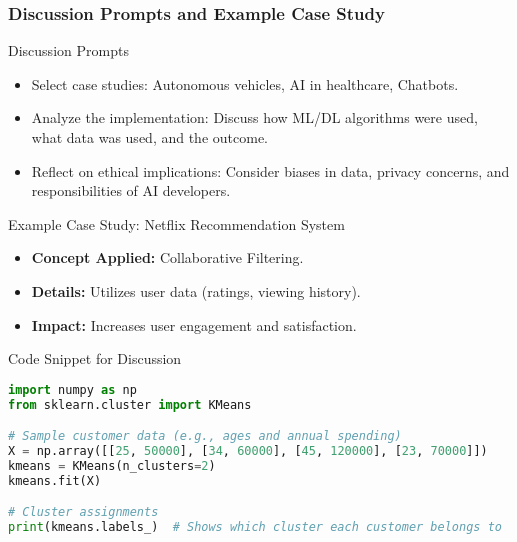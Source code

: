 \documentclass[aspectratio=169]{beamer}
\begin{document}
\begin{frame}[fragile]
    \frametitle{Discussion Prompts and Example Case Study}
    
    \begin{block}{Discussion Prompts}
        \begin{itemize}
            \item Select case studies: Autonomous vehicles, AI in healthcare, Chatbots.
            \item Analyze the implementation: Discuss how ML/DL algorithms were used, what data was used, and the outcome.
            \item Reflect on ethical implications: Consider biases in data, privacy concerns, and responsibilities of AI developers.
        \end{itemize}
    \end{block}

    \begin{block}{Example Case Study: Netflix Recommendation System}
        \begin{itemize}
            \item \textbf{Concept Applied:} Collaborative Filtering.
            \item \textbf{Details:} Utilizes user data (ratings, viewing history).
            \item \textbf{Impact:} Increases user engagement and satisfaction.
        \end{itemize}
    \end{block}
    
    \begin{block}{Code Snippet for Discussion}
    \begin{lstlisting}[language=Python]
import numpy as np
from sklearn.cluster import KMeans

# Sample customer data (e.g., ages and annual spending)
X = np.array([[25, 50000], [34, 60000], [45, 120000], [23, 70000]])
kmeans = KMeans(n_clusters=2)
kmeans.fit(X)

# Cluster assignments
print(kmeans.labels_)  # Shows which cluster each customer belongs to
    \end{lstlisting}
    \end{block}
\end{frame}
\end{document}
